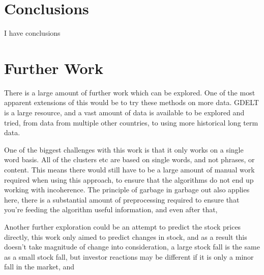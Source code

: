 \section{Conclusions}
I have conclusions




\section{Further Work}

There is a large amount of further work which can be explored. One of the most apparent extensions of this would be to try these methods on more data. GDELT is a large resource, and a vast amount of data is available to be explored and tried, from data from multiple other countries, to using more historical long term data.


One of the biggest challenges with this work is that it only works on a single word basis. All of the clusters etc are based on single words, and not phrases, or content. This means there would still have to be a large amount of manual work required when using this approach, to ensure that the algorithms do not end up working with incoherence. The principle of garbage in garbage out also applies here, there is a substantial amount of preprocessing required to ensure that you're feeding the algorithm useful information, and even after that,

Another further exploration could be an attempt to predict the stock prices directly, this work only aimed to predict changes in stock, and as a result this doesn't take magnitude of change into consideration, a large stock fall is the same as a small stock fall, but investor reactions may be different if it is only a minor fall in the market, and 
